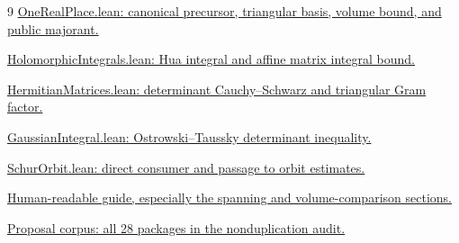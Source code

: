 \documentclass[11pt,letterpaper]{article}
\theoremstyle{remark}
\begin{document}
{\small
\begin{thebibliography}{9}
\setlength{\itemsep}{3pt}
\href{https://github.com/VladimirReshetnikov/ProveIt/blob/f2d6ab6c4b70ea73b2deac9e33ad966bc92ea36f/Analysis/GeneralizedRiemannHypothesis/Lean/grh/src/New/Spanning/RemainingTerms/OneRealPlace.lean}{OneRealPlace.lean: canonical precursor, triangular basis, volume bound, and public majorant.}

\href{https://github.com/VladimirReshetnikov/ProveIt/blob/f2d6ab6c4b70ea73b2deac9e33ad966bc92ea36f/Analysis/GeneralizedRiemannHypothesis/Lean/grh/src/Lib/General/Analysis/HolomorphicIntegrals.lean}{HolomorphicIntegrals.lean: Hua integral and affine matrix integral bound.}

\href{https://github.com/VladimirReshetnikov/ProveIt/blob/f2d6ab6c4b70ea73b2deac9e33ad966bc92ea36f/Analysis/GeneralizedRiemannHypothesis/Lean/grh/src/Lib/General/LinearAlgebra/HermitianMatrices.lean}{HermitianMatrices.lean: determinant Cauchy--Schwarz and triangular Gram factor.}

\href{https://github.com/VladimirReshetnikov/ProveIt/blob/f2d6ab6c4b70ea73b2deac9e33ad966bc92ea36f/Analysis/GeneralizedRiemannHypothesis/Lean/grh/src/Lib/General/Analysis/GaussianIntegral.lean}{GaussianIntegral.lean: Ostrowski--Taussky determinant inequality.}

\href{https://github.com/VladimirReshetnikov/ProveIt/blob/f2d6ab6c4b70ea73b2deac9e33ad966bc92ea36f/Analysis/GeneralizedRiemannHypothesis/Lean/grh/src/New/Spanning/RemainingTerms/SchurOrbit.lean}{SchurOrbit.lean: direct consumer and passage to orbit estimates.}

\href{https://github.com/VladimirReshetnikov/ProveIt/blob/f2d6ab6c4b70ea73b2deac9e33ad966bc92ea36f/Analysis/GeneralizedRiemannHypothesis/docs/guide/theta_lifts_and_dirichlet_zeros.tex}{Human-readable guide, especially the spanning and volume-comparison sections.}

\href{https://github.com/VladimirReshetnikov/ProveIt/tree/f2d6ab6c4b70ea73b2deac9e33ad966bc92ea36f/Analysis/GeneralizedRiemannHypothesis/docs/proposals}{Proposal corpus: all 28 packages in the nonduplication audit.}
\end{thebibliography}
}
\end{document}
